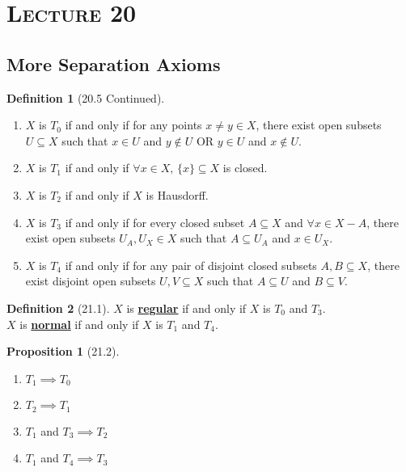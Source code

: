 \documentclass{article}
\newcommand{\Iff}{if and only if}
\newcommand{\define}[1]{\textbf{\underline{#1}}}
\renewcommand{\Subset}{\subseteq}
\theoremstyle{definition}
\newtheorem*{defn}{Definition}
\newtheorem*{prop}{Proposition}
\theoremstyle{remark}
\begin{document}
    \noindent\section*{\textbf{\textsc{Lecture 20}}}{
        \subsection*{More Separation Axioms}{
            \begin{defn}[20.5 Continued]
                \begin{enumerate}\hfill
                    \item $X$ is \define{$T_0$} \Iff{} for any points $x\neq y \in X$, there exist open subsets $U \Subset X$ such that $x \in U$ and $y \notin U$ OR $y \in U$ and $x \notin U$. 
                    \item $X$ is \define{$T_1$} \Iff{} $\forall x\in X, \, \{x\} \Subset X$ is closed.
                    \item $X$ is \define{$T_2$} \Iff{} $X$ is Hausdorff.
                    \item $X$ is \define{$T_3$} \Iff{} for every closed subset $A \Subset X$ and $\forall x \in X-A$, there exist open subsets $U_A,U_X \in X$ such that $A \Subset U_A$ and $x \in U_X$.
                    \item $X$ is \define{$T_4$} \Iff{} for any pair of disjoint closed subsets $A,B \Subset X$, there exist disjoint open subsets $U,V \Subset X$ such that $A \Subset U$ and $B \Subset V$.
                \end{enumerate}
            \end{defn}
            
            \begin{defn}[21.1]
                $X$ is \define{regular} \Iff{} $X$ is $T_0$ and $T_3$.\\
                $X$ is \define{normal} \Iff{} $X$ is $T_1$ and $T_4$.
            \end{defn}
            
            \begin{prop}[21.2]\hfill
                \begin{enumerate}
                    \item $T_1 \implies T_0$
                    \item $T_2 \implies T_1$
                    \item $T_1$ and $T_3 \implies T_2$
                    \item $T_1$ and $T_4 \implies T_3$
                \end{enumerate}
            \end{prop}
            
}}
\end{document}
